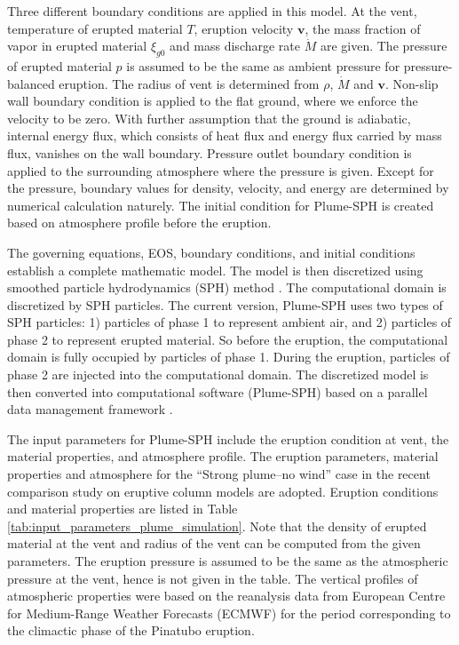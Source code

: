 \documentclass[utf8]{frontiersSCNS} %
\begin{document}
Three different boundary conditions are applied in this model. At the vent, temperature of erupted material $T$, eruption velocity $\textbf{v}$, the mass fraction of vapor in erupted material $\xi_{g0}$ and mass discharge rate $\dot M$ are given. The pressure of erupted material $p$ is assumed to be the same as ambient pressure for pressure-balanced eruption. The radius of vent is determined from $\rho$, $\dot M$ and $\textbf{v}$.  Non-slip wall boundary condition is applied to the flat ground, where we enforce the velocity to be zero. With further assumption that the ground is adiabatic, internal energy flux, which consists of heat flux and energy flux carried by mass flux, vanishes on the wall boundary. Pressure outlet boundary condition is applied to the surrounding atmosphere where the pressure is given. Except for the pressure,  boundary values for density, velocity, and energy are determined by numerical calculation naturely. The initial condition for Plume-SPH is created based on atmosphere profile before the eruption. 

The governing equations,  EOS, boundary conditions, and initial conditions establish a complete mathematic model. The model is then discretized using smoothed particle hydrodynamics (SPH) method \citep{gingold1977smoothed}. The computational domain is discretized by SPH particles. The current version, Plume-SPH \citep{cao2018plume} uses two types of SPH particles: 1) particles of phase 1 to represent ambient air, and 2) particles of phase 2 to represent erupted material. So before the eruption, the computational domain is fully occupied by particles of phase 1. During the eruption, particles of phase 2 are injected into the computational domain. The discretized model is then converted into computational software (Plume-SPH) based on a parallel data management framework \citep{cao2017data}.

The input parameters for Plume-SPH include the eruption condition at vent, the material properties, and atmosphere profile. The eruption parameters, material properties and atmosphere for the ``Strong plume--no wind'' case in the recent comparison study on eruptive column models \citep {costa2016results} are adopted. Eruption conditions and material properties are listed in Table \ref{tab:input_parameters_plume_simulation}. Note that the density of erupted material at the vent and radius of the vent can be computed from the given parameters. The eruption pressure is assumed to be the same as the atmospheric pressure at the vent, hence is not given in the table. The vertical profiles of atmospheric properties were  based on the reanalysis data from European Centre for Medium-Range Weather Forecasts (ECMWF) for the period corresponding to the climactic phase of the Pinatubo eruption. 
\end{document}
